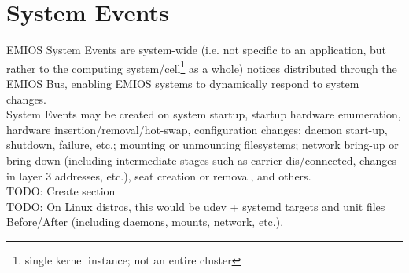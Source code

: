 \section{System Events}
EMIOS System Events are system-wide (i.e. not specific to an application, but rather to the computing system/cell\footnote{single kernel instance; not an entire cluster} as a whole) notices distributed through the EMIOS Bus, enabling EMIOS systems to dynamically respond to system changes.\\
System Events may be created on system startup, startup hardware enumeration, hardware insertion/removal/hot-swap, configuration changes; daemon start-up, shutdown, failure, etc.; mounting or unmounting filesystems; network bring-up or bring-down (including intermediate stages such as carrier dis/connected, changes in layer 3 addresses, etc.), seat creation or removal, and others.\\
TODO: Create section\\
TODO: On Linux distros, this would be udev + systemd targets and unit files Before/After (including daemons, mounts, network, etc.).
